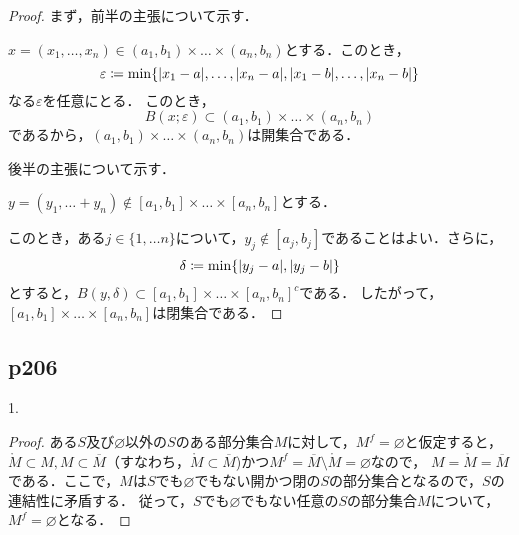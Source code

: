 \documentclass[dvipdfmx,uplatex,11pt]{jsarticle}
\begin{document}
\begin{leftbar}
    \begin{proof}
        まず，前半の主張について示す．

        $x=(x_1  , \dots , x_n)\in　(a_1 , b_1) \times \dots \times (a_n , b_n)$とする．このとき，
        \[
            \varepsilon \coloneqq \min \{ \abs{x_1-a},\dots,\abs{x_n -a},\abs{x_1-b},\dots, \abs{x_n-b} \}
        \]
        なる$\varepsilon$を任意にとる．
        このとき，
        \[
            B(x;\varepsilon) \subset (a_1 , b_1) \times \dots \times (a_n , b_n)
        \]
        であるから，$(a_1 , b_1) \times \dots \times (a_n , b_n)$は開集合である．

        後半の主張について示す．
        
        $ y = (y_1 , \dots + y_n ) \notin [a_1 , b_1] \times \dots \times [a_n , b_n]$とする．

        このとき，ある$j \in \{1,\dots n\}$について，$y_j \notin [a_j , b_j]$であることはよい．さらに，
        \[
            \delta \coloneqq \min  \{ \abs{y_j -a},\abs{y_j - b}\}
        \]
        とすると，$ B(y , \delta ) \subset {[a_1,b_1] \times \dots \times [a_n , b_n]}^c$である．
        したがって，$[a_1,b_1] \times \dots \times [a_n , b_n]$は閉集合である．
    \end{proof}
    \end{leftbar}
    \subsection{p206}
    1.
    \begin{leftbar}
        \begin{proof}
    ある$S$及び$\varnothing$以外の$S$のある部分集合$M$に対して，$M^f=\varnothing$と仮定すると，
    $\mathring{M}\subset M,M\subset\overline{M}$（すなわち，$\mathring{M}\subset\overline{M}$)かつ$M^f=\overline{M}\setminus\mathring{M}=\varnothing$なので，
$M=\mathring{M}=\overline{M}$である．ここで，$M$は$S$でも$\varnothing$でもない開かつ閉の$S$の部分集合となるので，$S$の連結性に矛盾する．
従って，$S$でも$\varnothing$でもない任意の$S$の部分集合$M$について，$M^f=\varnothing$となる．
        \end{proof}
    \end{leftbar}
\end{document}

